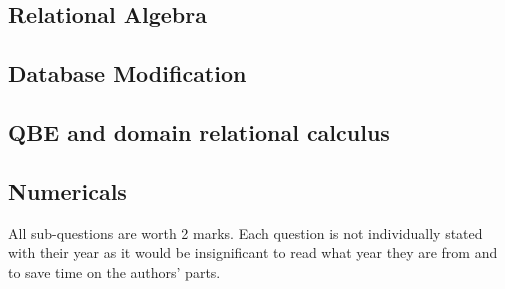 \documentclass[12pt]{article}
\begin{document}
    \subsection{Relational Algebra}
    \subsection{Database Modification}
    \subsection{QBE and domain relational calculus}
    \subsection{Numericals}
    All sub-questions are worth 2 marks. Each question is not individually stated with their year as it would be insignificant to read what year they are from and to save time on the authors' parts.
\end{document}
